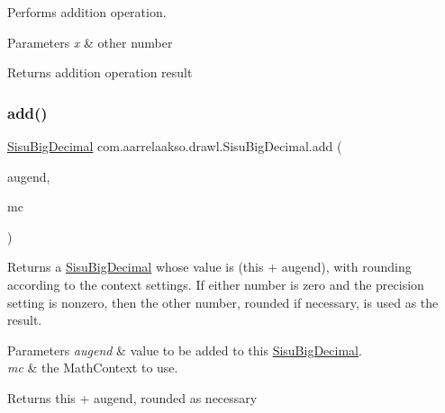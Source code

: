 Performs addition operation.


\begin{DoxyParams}{Parameters}
{\em x} & other number \\
\hline
\end{DoxyParams}
\begin{DoxyReturn}{Returns}
addition operation result 
\end{DoxyReturn}
\mbox{\label{classcom_1_1aarrelaakso_1_1drawl_1_1_sisu_big_decimal_ac90515f60f6f93b09d76ea389ffe689a}} 
\subsubsection{\texorpdfstring{add()}{add()}\hspace{0.1cm}{\footnotesize\ttfamily [3/3]}}
{\footnotesize\ttfamily \hyperlink{classcom_1_1aarrelaakso_1_1drawl_1_1_sisu_big_decimal}{Sisu\+Big\+Decimal} com.\+aarrelaakso.\+drawl.\+Sisu\+Big\+Decimal.\+add (\begin{DoxyParamCaption}\item[{\hyperlink{classcom_1_1aarrelaakso_1_1drawl_1_1_sisu_big_decimal}{Sisu\+Big\+Decimal}}]{augend,  }\item[{Math\+Context}]{mc }\end{DoxyParamCaption})\hspace{0.3cm}{\ttfamily [protected]}}

Returns a \hyperlink{classcom_1_1aarrelaakso_1_1drawl_1_1_sisu_big_decimal}{Sisu\+Big\+Decimal} whose value is (this + augend), with rounding according to the context settings. If either number is zero and the precision setting is nonzero, then the other number, rounded if necessary, is used as the result.


\begin{DoxyParams}{Parameters}
{\em augend} & value to be added to this \hyperlink{classcom_1_1aarrelaakso_1_1drawl_1_1_sisu_big_decimal}{Sisu\+Big\+Decimal}. \\
\hline
{\em mc} & the Math\+Context to use. \\
\hline
\end{DoxyParams}
\begin{DoxyReturn}{Returns}
this + augend, rounded as necessary 
\end{DoxyReturn}


